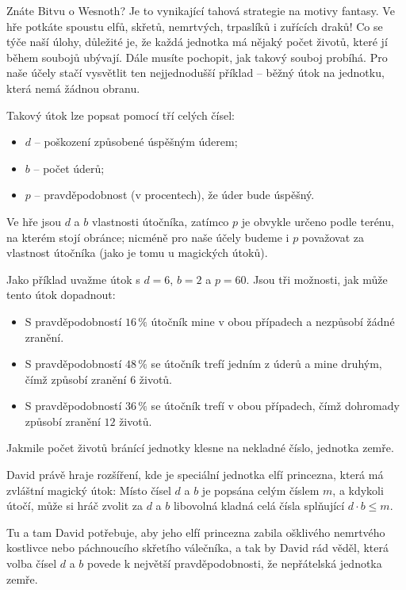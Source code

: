 





Znáte Bitvu o Wesnoth? Je to vynikající tahová strategie na motivy fantasy.
Ve hře potkáte spoustu elfů, skřetů, nemrtvých, trpaslíků i zuřících draků!
Co se týče naší úlohy, důležité je, že každá jednotka má nějaký počet životů,
které jí během soubojů ubývají. Dále musíte pochopit, jak takový souboj probíhá.
Pro naše účely stačí vysvětlit ten nejjednodušší příklad --
běžný útok na jednotku, která nemá žádnou obranu.

Takový útok lze popsat pomocí tří celých čísel:
\begin{itemize}
 \item $d$ -- poškození způsobené úspěšným úderem;
 \item $b$ -- počet úderů;
 \item $p$ -- pravděpodobnost (v procentech), že úder bude úspěšný.
\end{itemize}
Ve hře jsou $d$ a $b$ vlastnosti útočníka, zatímco $p$ je obvykle určeno podle terénu,
na kterém stojí obránce; nicméně pro naše účely budeme i $p$ považovat za vlastnost útočníka
(jako je tomu u magických útoků).

Jako příklad uvažme útok s $d=6$, $b=2$ a $p=60$. Jsou tři možnosti, jak může tento útok dopadnout:
\begin{itemize}
 \item S pravděpodobností $16\,\%$ útočník mine v obou případech a nezpůsobí žádné zranění.
 \item S pravděpodobností $48\,\%$ se útočník trefí jedním z úderů a mine druhým, čímž způsobí zranění $6$ životů.
 \item S pravděpodobností $36\,\%$ se útočník trefí v obou případech, čímž dohromady způsobí zranění $12$ životů.
\end{itemize}
Jakmile počet životů bránící jednotky klesne na nekladné číslo, jednotka zemře.

David právě hraje rozšíření, kde je speciální jednotka elfí princezna, která má zvláštní magický útok:
Místo čísel $d$ a $b$ je popsána celým číslem $m$, a kdykoli útočí, může si hráč zvolit
za $d$ a $b$ libovolná kladná celá čísla splňující $d\cdot b\leq m$.

Tu a tam David potřebuje, aby jeho elfí princezna zabila ošklivého nemrtvého kostlivce nebo páchnoucího skřetího válečníka,
a tak by David rád věděl, která volba čísel $d$ a $b$ povede k největší pravděpodobnosti, že nepřátelská jednotka zemře.

